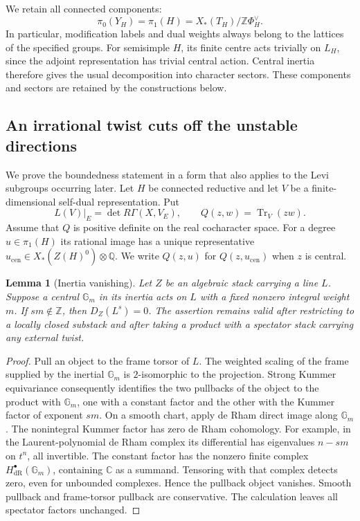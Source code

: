 \documentclass[11pt]{article}
\numberwithin{equation}{section}
\newtheorem{lemma}[theorem]{Lemma}
\theoremstyle{definition}
\theoremstyle{remark}
\begin{document}
We retain all connected components:
\begin{equation}\label{foundations:components}
 \pi_0(Y_H)=\pi_1(H)
 =X_*(T_H)/\mathbb Z\Phi_H^\vee.
\end{equation}
In particular, modification labels and dual weights always belong to the
lattices of the specified groups.  For semisimple $H$, its finite centre
acts trivially on $L_H$, since the adjoint representation has trivial
central action.  Central inertia therefore gives the usual decomposition
into character sectors.  These components and sectors are retained by the
constructions below.

\subsection{An irrational twist cuts off the unstable directions}

We prove the boundedness statement in a form that also applies to the
Levi subgroups occurring later.  Let $H$ be connected reductive and let
$V$ be a finite-dimensional self-dual representation.  Put
\[
 L(V)|_E=\det R\Gamma(X,V_E),\qquad
 Q(z,w)=\operatorname{Tr}_V(zw).
\]
Assume that $Q$ is positive definite on the real cocharacter space.
For a degree $u\in\pi_1(H)$ its rational image has a unique representative
$u_{\mathrm{cen}}\in X_*(Z(H)^0)\otimes\mathbb Q$.  We write $Q(z,u)$
for $Q(z,u_{\mathrm{cen}})$ when $z$ is central.

\begin{lemma}[Inertia vanishing]\label{foundations:inertia}
Let $Z$ be an algebraic stack carrying a line $L$.  Suppose a central
$\mathbb G_m$ in its inertia acts on $L$ with a fixed nonzero integral
weight $m$.  If $sm\notin\mathbb Z$, then $D_Z(L^s)=0$.
The assertion remains valid after restricting to a locally closed
substack and after taking a product with a spectator stack carrying any
external twist.
\end{lemma}

\begin{proof}
Pull an object to the frame torsor of $L$.  The weighted scaling of the
frame supplied by the inertial $\mathbb G_m$ is $2$-isomorphic to the
projection.  Strong Kummer equivariance consequently identifies the two
pullbacks of the object to the product with $\mathbb G_m$, one with a
constant factor and the other with the Kummer factor of exponent $sm$.
On a smooth chart, apply de Rham direct image along $\mathbb G_m$.
The nonintegral Kummer factor has zero de Rham cohomology.  For example,
in the Laurent-polynomial de Rham complex its differential has eigenvalues
$n-sm$ on $t^n$, all invertible.  The constant factor has the nonzero finite
complex $H^\bullet_{\mathrm{dR}}(\mathbb G_m)$, containing $\mathbb C$ as a
summand.  Tensoring with that complex detects zero, even for unbounded
complexes.  Hence the pullback object vanishes.  Smooth pullback and
frame-torsor pullback are conservative.  The calculation leaves all
spectator factors unchanged.
\end{proof}
\end{document}
